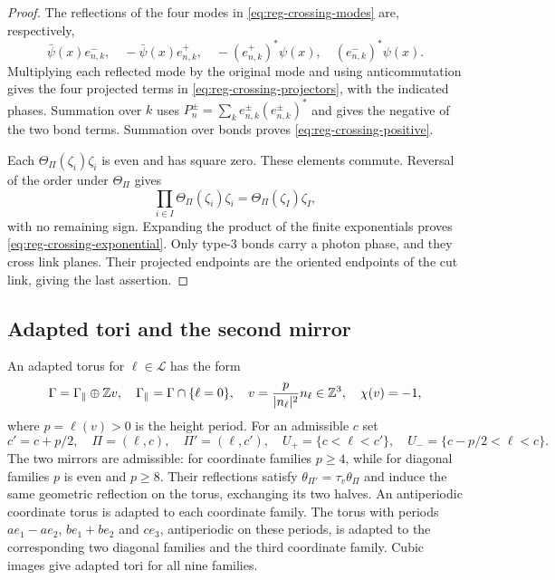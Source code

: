 \begin{proof}
The reflections of the four modes in \eqref{eq:reg-crossing-modes}
are, respectively,
\[
 \bar\psi(x)e_{n,k}^-,\quad-\bar\psi(x)e_{n,k}^+,
 \quad-(e_{n,k}^+)^*\psi(x),\quad(e_{n,k}^-)^*\psi(x).
\]
Multiplying each reflected mode by the original mode and using
anticommutation gives the four projected terms in
\eqref{eq:reg-crossing-projectors}, with the indicated phases.
Summation over $k$ uses
$P_n^\pm=\sum_ke_{n,k}^\pm(e_{n,k}^\pm)^*$ and gives the negative of
the two bond terms. Summation over bonds proves
\eqref{eq:reg-crossing-positive}.

Each $\Theta_\Pi(\zeta_i)\zeta_i$ is even and has square zero.
These elements commute. Reversal of the order under $\Theta_\Pi$
gives
\[
 \prod_{i\in I}\Theta_\Pi(\zeta_i)\zeta_i
 =\Theta_\Pi(\zeta_I)\zeta_I,
\]
with no remaining sign. Expanding the product of the finite
exponentials proves \eqref{eq:reg-crossing-exponential}.
Only type-$3$ bonds carry a photon phase, and they cross link
planes. Their projected endpoints are the oriented endpoints of
the cut link, giving the last assertion.
\end{proof}

\subsection{Adapted tori and the second mirror}\label{subsec:reg-adapted}

An adapted torus for $\ell\in\mathcal L$ has the form
\begin{equation}\label{eq:reg-adapted-torus}
 \Gamma=\Gamma_\parallel\oplus\mathbb Z v,
 \quad \Gamma_\parallel=\Gamma\cap\{\ell=0\},
 \quad v=\frac{p}{|n_\ell|^2}n_\ell\in\mathbb Z^3,
 \quad \chi(v)=-1,
\end{equation}
where $p=\ell(v)>0$ is the height period. For an admissible $c$ set
\[
 c'=c+p/2,\quad \Pi=(\ell,c),\quad\Pi'=(\ell,c'),\quad
 U_+=\{c<\ell<c'\},\quad U_-=\{c-p/2<\ell<c\}.
\]
The two mirrors are admissible: for coordinate families $p\ge4$,
while for diagonal families $p$ is even and $p\ge8$. Their
reflections satisfy $\theta_{\Pi'}=\tau_v\theta_\Pi$ and induce the
same geometric reflection on the torus, exchanging its two halves.
An antiperiodic coordinate torus is adapted to each coordinate
family. The torus with periods $ae_1-ae_2$, $be_1+be_2$ and $ce_3$,
antiperiodic on these periods, is adapted to the corresponding two
diagonal families and the third coordinate family. Cubic images
give adapted tori for all nine families.

